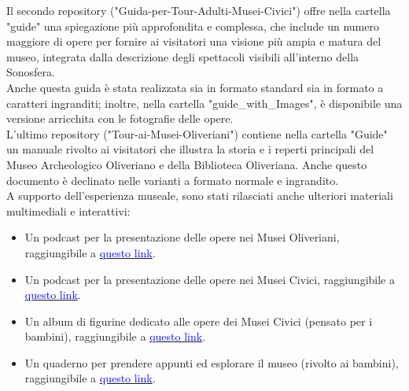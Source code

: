 \documentclass[hidelinks,12pt,a4paper]{article}
\begin{document}
\begin{flushleft}
        \bigskip
        Il secondo repository ("Guida-per-Tour-Adulti-Musei-Civici") offre nella cartella "guide" una spiegazione più approfondita e complessa, che include un numero maggiore di opere per fornire ai visitatori una visione più ampia e matura del museo, integrata dalla descrizione degli spettacoli visibili all'interno della Sonosfera.\\
        Anche questa guida è stata realizzata sia in formato standard sia in formato a caratteri ingranditi; inoltre, nella cartella "guide\_with\_Images", è disponibile una versione arricchita con le fotografie delle opere.\\
        \bigskip
        L'ultimo repository ("Tour-ai-Musei-Oliveriani") contiene nella cartella "Guide" un manuale rivolto ai visitatori che illustra la storia e i reperti principali del Museo Archeologico Oliveriano e della Biblioteca Oliveriana. Anche questo documento è declinato nelle varianti a formato normale e ingrandito.\\
        \bigskip
        A supporto dell'esperienza museale, sono stati rilasciati anche ulteriori materiali multimediali e interattivi: 
        
        \begin{itemize}
            \item Un podcast per la presentazione delle opere nei Musei Oliveriani, raggiungibile a \href{https://github.com/Pomodoro-Musei-di-Pesaro/Musei-Oliveriani-Podcast}{\textcolor{blue}{questo link}}.
            \item Un podcast per la presentazione delle opere nei Musei Civici, raggiungibile a \href{https://github.com/Pomodoro-Musei-di-Pesaro/Musei-Civici-Podcast}{\textcolor{blue}{questo link}}.
            \item Un album di figurine dedicato alle opere dei Musei Civici (pensato per i bambini), raggiungibile a \href{https://github.com/Pomodoro-Musei-di-Pesaro/Pesaro-Museums-stickers-Album}{\textcolor{blue}{questo link}}.
            \item Un quaderno per prendere appunti ed esplorare il museo (rivolto ai bambini), raggiungibile a \href{https://github.com/Pomodoro-Musei-di-Pesaro/Pesaro-Museums-Notebook}{\textcolor{blue}{questo link}}.
        \end{itemize}
        
        \vspace*{\fill}
        \doclicenseThis
        
    \end{flushleft}
\end{document}
